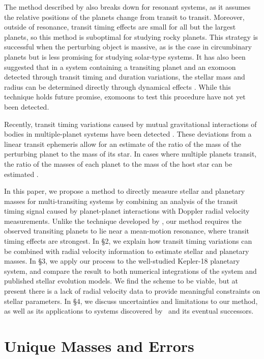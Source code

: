 The method described by \citet{Agol05} also breaks down for resonant systems, as it assumes the relative positions of the planets change from transit to transit. Moreover, outside of resonance, transit timing effects are small for all but the largest planets, so this method is suboptimal for studying rocky planets. This strategy is successful when the perturbing object is massive, as is the case in circumbinary planets \citep{Doyle11, Welsh12} but is less promising for studying solar-type systems. It has also been suggested that in a system containing a transiting planet and an exomoon detected through transit timing and duration variations, the stellar mass and radius can be determined directly through dynamical effects \citep{Kipping10}. While this technique holds future promise, exomoons to test this procedure have not yet been detected.

Recently, transit timing variations caused by mutual gravitational interactions of bodies in multiple-planet systems have been detected \citep{Holman10, Ford12TTV}. These deviations from a linear transit ephemeris allow for an estimate of the ratio of the mass of the perturbing planet to the mass of its star. In cases where multiple planets transit, the ratio of the masses of each planet to the mass of the host star can be estimated \citep{Fabrycky12, Steffen12a}.

In this paper, we propose a method to directly measure stellar and planetary masses for multi-transiting systems by combining an analysis of the transit timing signal caused by planet-planet interactions with Doppler radial velocity measurements. Unlike the technique developed by \citet{Agol05}, our method requires the observed transiting planets to lie near a mean-motion resonance, where transit timing effects are strongest. In \S2, we explain how transit timing variations can be combined with radial velocity information to estimate stellar and planetary masses. In \S3, we apply our process to the well-studied Kepler-18 planetary system, and compare the result to both numerical integrations of the system and published stellar evolution models. We find the scheme to be viable, but at present there is a lack of radial velocity data to provide meaningful constraints on stellar parameters. In \S4, we discuss uncertainties and limitations to our method, as well as its applications to systems discovered by \kep\ and its eventual successors.


\section{Unique Masses and Errors}

